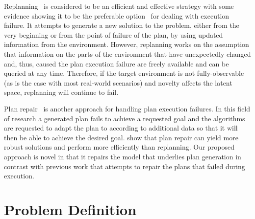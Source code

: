 \documentclass[letterpaper]{article} %
\begin{document}
Replanning~\cite{cushing2005replanning, bezrucav2022towards} is considered to be an efficient and effective strategy with some evidence showing it to be the preferable option~\cite{nebel1995plan} for dealing with execution failure. It attempts to generate a new solution to the problem, either from the very beginning or from the point of failure of the plan, by using updated information from the environment. However, replanning works on the assumption that information on the parts of the environment that have unexpectedly changed and, thus, caused the plan execution failure are freely available and can be queried at any time. Therefore, if the target environment is not fully-observable (as is the case with most real-world scenarios) and novelty affects the latent space, replanning will continue to fail.

Plan repair~\cite{myers1999cpef, bidot2008plan, komenda2014domain} is another approach for handling plan execution failures. In this field of research a generated plan fails to achieve a requested goal and the algorithms are requested to adapt the plan to according to additional data so that it will then be able to achieve the desired goal. \cite{fox2006plan} show that plan repair can yield more robust solutions and perform more efficiently than replanning.
Our proposed approach is novel in that it repairs the model that underlies plan generation in contrast with previous work that attempts to repair the plans that failed during execution.



\section{Problem Definition}
\end{document}

